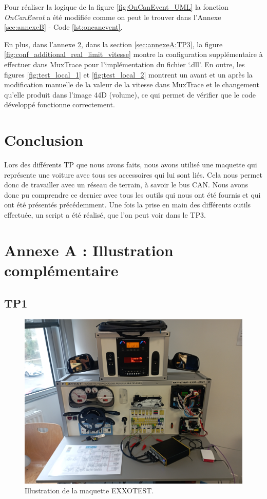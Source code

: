 \documentclass{rapportECC}
\begin{document}
Pour réaliser la logique de la figure \ref{fig:OnCanEvent_UML} la fonction \textit{OnCanEvent} a été modifiée comme on peut le trouver dans l'Annexe \ref{sec:annexeB} - Code \ref{lst:oncanevent}.

En plus, dans l'annexe \ref{sec:annexeA}, dans la section \ref{sec:annexeA:TP3}, la figure \ref{fig:conf_additional_real_limit_vitesse} montre la configuration supplémentaire à effectuer dans MuxTrace pour l'implémentation du fichier `.dll'. En outre, les figures \ref{fig:test_local_1} et \ref{fig:test_local_2} montrent un avant et un après la modification manuelle de la valeur de la vitesse dans MuxTrace et le changement qu'elle produit dans l'image 44D (volume), ce qui permet de vérifier que le code développé fonctionne correctement.

\section{Conclusion}

Lors des différents TP que nous avons faits, nous avons utilisé une maquette qui représente une voiture avec tous ses accessoires qui lui sont liés. Cela nous permet donc de travailler avec un réseau de terrain, à savoir le bus CAN. Nous avons donc pu comprendre ce dernier avec tous les outils qui nous ont été fournis et qui ont été présentés précédemment.
Une fois la prise en main des différents outils effectuée, un script a été réalisé, que l'on peut voir dans le TP3.


 


\pagebreak

\appendix

\section{Annexe A : Illustration complémentaire}\label{sec:annexeA}

\subsection{TP1}

\begin{figure}[H]
    \centering
    \includegraphics[width=.7\textwidth]{./images/maquette.jpg}
    \caption{Illustration de la maquette EXXOTEST.}
    \label{fig:maquette_EXXOTEST}
\end{figure}
\end{document}
